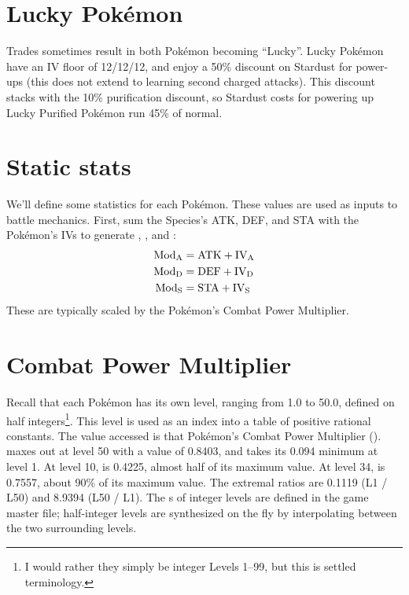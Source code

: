 
\section{Lucky Pokémon\label{sec:lucky}}
Trades sometimes result in both Pokémon becoming ``Lucky''.
Lucky Pokémon have an IV floor of 12/12/12, and enjoy a 50\% discount on Stardust for power-ups
  (this does not extend to learning second charged attacks).
This discount stacks with the 10\% purification discount, so Stardust costs for
  powering up Lucky Purified Pokémon run 45\% of normal.

\section{Static stats\label{sec:staticstats}}
We'll define some statistics for each Pokémon.
These values are used as inputs to battle mechanics.
First, sum the Species's ATK, DEF, and STA with the Pokémon's
IVs to generate , , and :
\begin{align*}
 \mbox{$\text{Mod}_\text{A}$} &= \mathrm{ATK} + \mathit{\mbox{$\text{IV}_\text{A}$}} \\
 \mbox{$\text{Mod}_\text{D}$} &= \mathrm{DEF} + \mathit{\mbox{$\text{IV}_\text{D}$}} \\
 \mbox{$\text{Mod}_\text{S}$} &= \mathrm{STA} + \mathit{\mbox{$\text{IV}_\text{S}$}}
\end{align*}
These are typically scaled by the Pokémon's Combat Power Multiplier.
\section{Combat Power Multiplier\label{sec:cpm}}
Recall that each Pokémon has its own level, ranging from 1.0
 to 50.0, defined on half integers\footnote{I would rather they
 simply be integer Levels 1--99, but this is settled terminology.}.
This level is used as an index into a table of positive rational constants.
The value accessed is that Pokémon's Combat Power Multiplier (\CPM).
\CPM{} maxes out at level 50 with a value of 0.8403, and takes its 0.094 minimum at level 1.
At level 10, \CPM{} is 0.4225, almost half of its maximum value.
At level 34, \CPM{} is 0.7557, about 90\% of its maximum value.
The extremal ratios are 0.1119 (L1 / L50) and 8.9394 (L50 / L1).
The \CPM{}s of integer levels are defined in the game master file; half-integer levels
 are synthesized on the fly by interpolating between the two surrounding levels.

